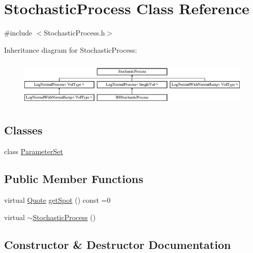 \hypertarget{class_stochastic_process}{}\section{Stochastic\+Process Class Reference}
\label{class_stochastic_process}


{\ttfamily \#include $<$Stochastic\+Process.\+h$>$}

Inheritance diagram for Stochastic\+Process\+:\begin{figure}[H]
\begin{center}
\leavevmode
\includegraphics[height=2.276423cm]{class_stochastic_process}
\end{center}
\end{figure}
\subsection*{Classes}
\begin{DoxyCompactItemize}
\item 
class \hyperlink{class_stochastic_process_1_1_parameter_set}{Parameter\+Set}
\end{DoxyCompactItemize}
\subsection*{Public Member Functions}
\begin{DoxyCompactItemize}
\item 
virtual \hyperlink{_name_def_8h_a642a6c5fd87319d922637de0e0bb0305}{Quote} \hyperlink{class_stochastic_process_aad2ef51ca4bc2fe5f33a73e8f0ee361e}{get\+Spot} () const =0
\item 
virtual \hyperlink{class_stochastic_process_ac9c66520ce049a6ee61c079d2910e409}{$\sim$\+Stochastic\+Process} ()
\end{DoxyCompactItemize}


\subsection{Constructor \& Destructor Documentation}
\hypertarget{class_stochastic_process_ac9c66520ce049a6ee61c079d2910e409}{}\label{class_stochastic_process_ac9c66520ce049a6ee61c079d2910e409} 
